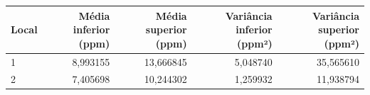 \begin{tabular}{lrrrr}
\toprule
Local & Média inferior (ppm) & Média superior (ppm) & Variância inferior (ppm²) & Variância superior (ppm²) \\
\midrule
1 & 8,993155 & 13,666845 & 5,048740 & 35,565610 \\
2 & 7,405698 & 10,244302 & 1,259932 & 11,938794 \\
\bottomrule
\end{tabular}

